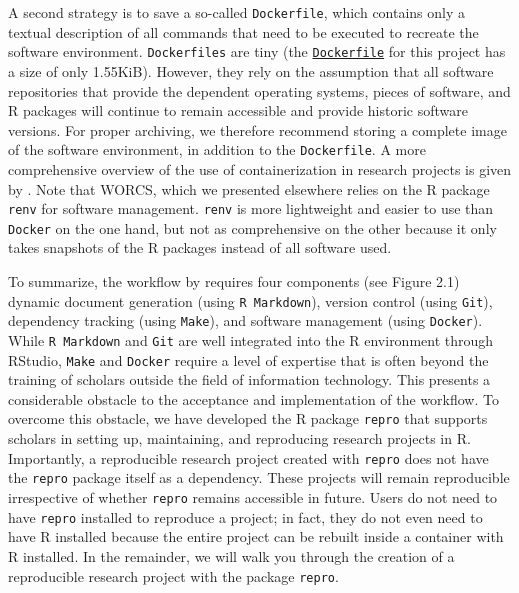 \documentclass[psych,tutorial,submit,moreauthors,pdftex]{mdpi}
\begin{document}
A second strategy is to save a so-called \texttt{Dockerfile}, which
contains only a textual description of all commands that need to be
executed to recreate the software environment. \texttt{Dockerfiles} are
tiny (the
\href{https://github.com/aaronpeikert/repro-tutorial/blob/main/Dockerfile}{\texttt{Dockerfile}}
for this project has a size of only 1.55KiB). However, they rely on the
assumption that all software repositories that provide the dependent
operating systems, pieces of software, and R packages will continue to
remain accessible and provide historic software versions. For proper
archiving, we therefore recommend storing a complete image of the
software environment, in addition to the \texttt{Dockerfile}. A more
comprehensive overview of the use of containerization in research
projects is given by
\citet{wiebelsLeveragingContainersReproducible2021}. Note that WORCS,
which we presented elsewhere \citep{vanlissa2020worcs} relies on the R
package \texttt{renv} \citep{R-renv} for software management.
\texttt{renv} is more lightweight and easier to use than \texttt{Docker}
on the one hand, but not as comprehensive on the other because it only
takes snapshots of the R packages instead of all software used.

To summarize, the workflow by \citet{Peikert2019} requires four
components (see Figure 2.1) dynamic document generation (using
\texttt{R\ Markdown}), version control (using \texttt{Git}), dependency
tracking (using \texttt{Make}), and software management (using
\texttt{Docker}). While \texttt{R\ Markdown} and \texttt{Git} are well
integrated into the R environment through RStudio, \texttt{Make} and
\texttt{Docker} require a level of expertise that is often beyond the
training of scholars outside the field of information technology. This
presents a considerable obstacle to the acceptance and implementation of
the workflow. To overcome this obstacle, we have developed the R package
\texttt{repro} that supports scholars in setting up, maintaining, and
reproducing research projects in R. Importantly, a reproducible research
project created with \texttt{repro} does not have the \texttt{repro}
package itself as a dependency. These projects will remain reproducible
irrespective of whether \texttt{repro} remains accessible in future.
Users do not need to have \texttt{repro} installed to reproduce a
project; in fact, they do not even need to have R installed because the
entire project can be rebuilt inside a container with R installed. In
the remainder, we will walk you through the creation of a reproducible
research project with the package \texttt{repro}.
\end{document}
